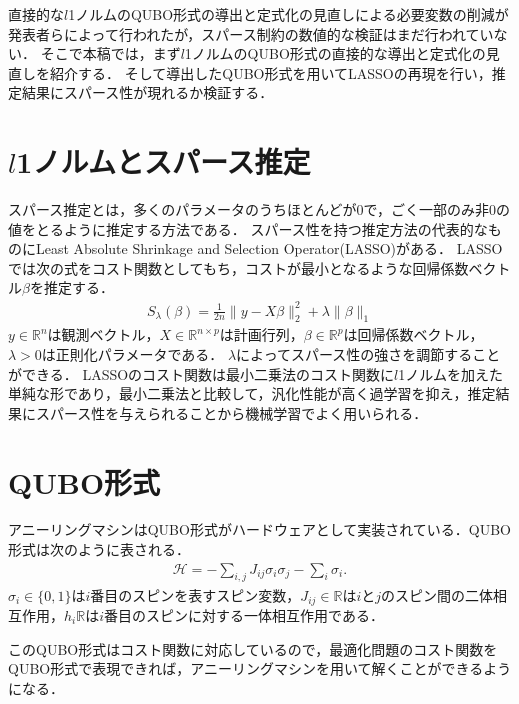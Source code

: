 \documentclass[technicalreport]{ieicej}
\begin{document}
直接的な$l$1ノルムのQUBO形式の導出と定式化の見直しによる必要変数の削減\cite{l1-norm}が発表者らによって行われたが，スパース制約の数値的な検証はまだ行われていない．
そこで本稿では，まず$l$1ノルムのQUBO形式の直接的な導出と定式化の見直しを紹介する．
そして導出したQUBO形式を用いてLASSOの再現を行い，推定結果にスパース性が現れるか検証する．

\section{$l$1ノルムとスパース推定}
スパース推定とは，多くのパラメータのうちほとんどが0で，ごく一部のみ非0の値をとるように推定する方法である．
スパース性を持つ推定方法の代表的なものにLeast Absolute Shrinkage and Selection Operator(LASSO)がある．
LASSOでは次の式をコスト関数としてもち，コストが最小となるような回帰係数ベクトル$\beta$を推定する．
\begin{eqnarray}
  S_{\lambda}(\beta)=\frac{1}{2n}\|y-X\beta\|^{2}_{2}+\lambda\|\beta\|_{1}
\end{eqnarray}
$y\in\mathbb{R}^{n}$は観測ベクトル，$X\in\mathbb{R}^{n\times p}$は計画行列，$\beta\in\mathbb{R}^{p}$は回帰係数ベクトル，$\lambda >0$は正則化パラメータである．
$\lambda$によってスパース性の強さを調節することができる．
LASSOのコスト関数は最小二乗法のコスト関数に$l$1ノルムを加えた単純な形であり，最小二乗法と比較して，汎化性能が高く過学習を抑え，推定結果にスパース性を与えられることから機械学習でよく用いられる．

\section{QUBO形式}
アニーリングマシンはQUBO形式がハードウェアとして実装されている．QUBO形式は次のように表される．
\begin{eqnarray}
  \mathcal{H} = -\sum_{i,j}{J_{ij}\sigma_{i}\sigma_{j}}-\sum_{i}{\sigma_{i}}. \label{QUBO_model}
\end{eqnarray}
$\sigma_{i}\in\{ 0,1\}$は$i$番目のスピンを表すスピン変数，$J_{ij}\in\mathbb{R}$は$i$と$j$のスピン間の二体相互作用，$h_{i}\mathbb{R}$は$i$番目のスピンに対する一体相互作用である．

このQUBO形式はコスト関数に対応しているので，最適化問題のコスト関数をQUBO形式で表現できれば，アニーリングマシンを用いて解くことができるようになる．
\end{document}
